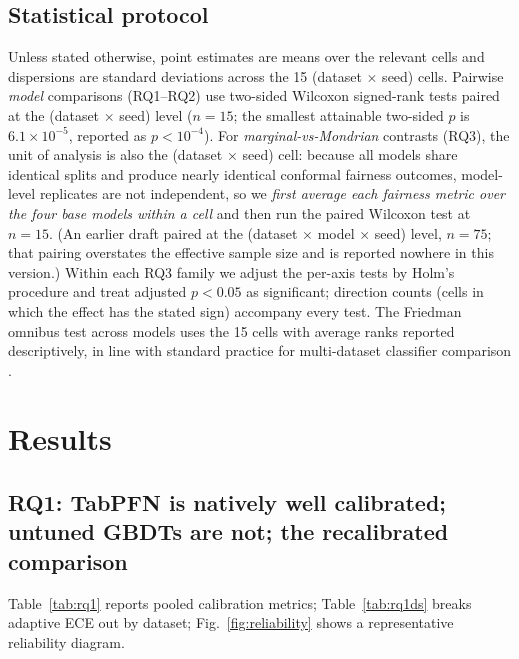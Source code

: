 \documentclass[review,12pt]{elsarticle}
\begin{document}
\subsection{Statistical protocol}
\label{sec:stats}
Unless stated otherwise, point estimates are means over the relevant cells and dispersions are standard deviations across the 15 (dataset $\times$ seed) cells. Pairwise \emph{model} comparisons (RQ1--RQ2) use two-sided Wilcoxon signed-rank tests \cite{wilcoxon1945} paired at the (dataset $\times$ seed) level ($n=15$; the smallest attainable two-sided $p$ is $6.1\times10^{-5}$, reported as $p<10^{-4}$). For \emph{marginal-vs-Mondrian} contrasts (RQ3), the unit of analysis is also the (dataset $\times$ seed) cell: because all models share identical splits and produce nearly identical conformal fairness outcomes, model-level replicates are not independent, so we \emph{first average each fairness metric over the four base models within a cell} and then run the paired Wilcoxon test at $n=15$. (An earlier draft paired at the (dataset $\times$ model $\times$ seed) level, $n=75$; that pairing overstates the effective sample size and is reported nowhere in this version.) Within each RQ3 family we adjust the per-axis tests by Holm's procedure \cite{holm1979} and treat adjusted $p<0.05$ as significant; direction counts (cells in which the effect has the stated sign) accompany every test. The Friedman omnibus test \cite{friedman1937} across models uses the 15 cells with average ranks reported descriptively, in line with standard practice for multi-dataset classifier comparison \cite{demsar2006}.

\section{Results}
\label{sec:results}

\subsection{RQ1: TabPFN is natively well calibrated; untuned GBDTs are not; the recalibrated comparison}
\label{sec:rq1}

Table~\ref{tab:rq1} reports pooled calibration metrics; Table~\ref{tab:rq1ds} breaks adaptive ECE out by dataset; Fig.~\ref{fig:reliability} shows a representative reliability diagram.
\end{document}
